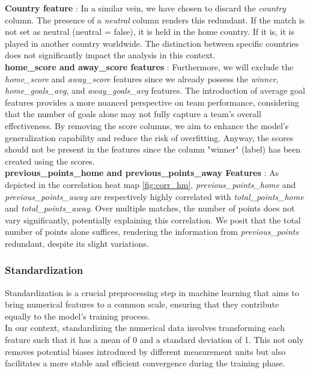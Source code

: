 \documentclass[a4paper,12pt]{article}
\begin{document}
{\bf Country feature} : In a similar vein, we have chosen to discard the {\it country} column. The presence of a {\it neutral} column renders this redundant. If the match is not set as neutral (neutral = false), it is held in the home country. If it is, it is played in another country worldwide. The distinction between specific countries does not significantly impact the analysis in this context.\\

{\bf home\_score and away\_score features} : Furthermore, we will exclude the {\it home\_score} and {\it away\_score} features since we already possess the {\it winner}, {\it home\_goals\_avg}, and {\it away\_goals\_avg} features. The introduction of average goal features provides a more nuanced perspective on team performance, considering that the number of goals alone may not fully capture a team's overall effectiveness. By removing the score columns, we aim to enhance the model's generalization capability and reduce the risk of overfitting. Anyway, the scores should not be present in the features since the column "winner" (label) has been created using the scores.\\

{\bf previous\_points\_home and previous\_points\_away Features} : As depicted in the correlation heat map \ref{fig:corr_hm}, \textit{previous\_points\_home} and \textit{previous\_points\_away} are respectively highly correlated with \textit{total\_points\_home} and \textit{total\_points\_away}. Over multiple matches, the number of points does not vary significantly, potentially explaining this correlation. We posit that the total number of points alone suffices, rendering the information from \textit{previous\_points} redundant, despite its slight variations.


\subsubsection{Standardization}

Standardization is a crucial preprocessing step in machine learning that aims to bring numerical features to a common scale, ensuring that they contribute equally to the model's training process.\\

In our context, standardizing the numerical data involves transforming each feature such that it has a mean of 0 and a standard deviation of 1. This not only removes potential biases introduced by different measurement units but also facilitates a more stable and efficient convergence during the training phase.\\
\end{document}
